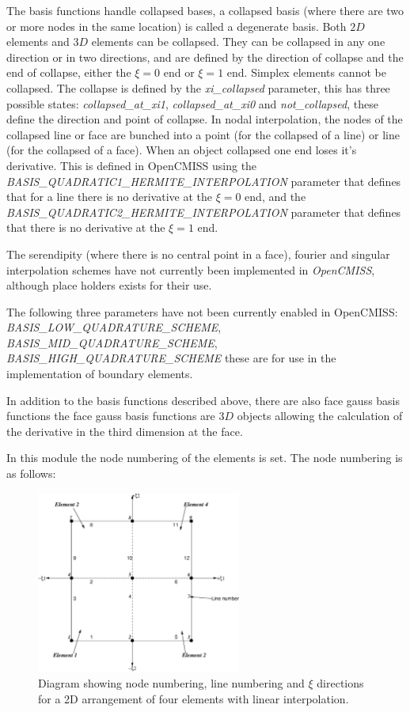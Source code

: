 The basis functions handle collapsed bases, a collapsed basis (where there are 
two or more nodes in the same location) is called a degenerate basis. Both $2D$ 
elements and $3D$ elements can be collapsed. They can be collapsed in any one 
direction or in two directions, and are defined by the direction of collapse 
and the end of collapse, either the $\xi=0$ end or $\xi=1$ end. Simplex
elements cannot be collapsed. The collapse is defined by the 
\emph{xi\_collapsed} parameter, this has three possible states: 
\emph{collapsed\_at\_xi1}, \emph{collapsed\_at\_xi0} and 
\emph{not\_collapsed}, these define the direction and point of collapse. In
nodal interpolation, the nodes of the collapsed line or face are bunched into 
a point (for the collapsed of a line) or line (for the collapsed of a face).
When an object collapsed one end loses it's derivative. This is defined in 
OpenCMISS using the \emph{BASIS\_QUADRATIC1\_HERMITE\_INTERPOLATION} parameter
that defines that for a line there is no derivative at the $\xi=0$ end, and 
the  \emph{BASIS\_QUADRATIC2\_HERMITE\_INTERPOLATION} parameter that defines 
that there is no derivative at the $\xi=1$ end.

The serendipity (where there is no central point in a face), fourier and
singular interpolation schemes have not currently been implemented in 
\emph{OpenCMISS}, although place holders exists for their use.

The following three parameters have not been currently enabled in OpenCMISS: 
\emph{BASIS\_LOW\_QUADRATURE\_SCHEME}, \emph{BASIS\_MID\_QUADRATURE\_SCHEME},
\emph{BASIS\_HIGH\_QUADRATURE\_SCHEME} these are for use in the implementation
of boundary elements.

In addition to the basis functions described above, there are also face gauss 
basis functions the face gauss basis functions are $3D$ objects allowing the 
calculation of the derivative in the third dimension at the face.

In this module the node numbering of the elements is set. The node 
numbering is as follows:

\begin{figure}
\centering
      \includegraphics[width=0.6\textwidth]{figs/Modules/2D_linear.eps}
\caption{Diagram showing node numbering, line numbering and $\xi$ directions 
for a 2D arrangement of four elements with linear interpolation.}
\label{2D_linear}
\end{figure}

